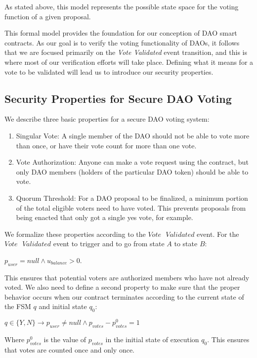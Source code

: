 \documentclass[conference]{IEEEtran}
\begin{document}
As stated above, this model represents the possible state space for the voting function of a given proposal. 

This formal model provides the foundation for our conception of DAO smart contracts. As our goal is to verify the voting functionality of DAOs, it follows that we are focused primarily on the \textit{Vote Validated} event transition, and this is where most of our verification efforts will take place. Defining what it means for a vote to be validated will lead us to introduce our security properties.

\subsection{Security Properties for Secure DAO Voting}
We describe three basic properties for a secure DAO voting system:
\begin{enumerate}
    \item Singular Vote: A single member of the DAO should not be able to vote more than once, or have their vote count for more than one vote.
    \item Vote Authorization: Anyone can make a vote request using the contract, but only DAO members (holders of the particular DAO token) should be able to vote.
    \item Quorum Threshold: For a DAO proposal to be finalized, a minimum portion of the total eligible voters need to have voted. This prevents proposals from being enacted that only got a single yes vote, for example.
\end{enumerate}

We formalize these properties according to the $Vote\mbox{ }Validated$ event.
For the $Vote\mbox{ }Validated$ event to trigger and to go from state $A$ to state $B$:
\begin{center}
$p_{user} = null \land u_{balance} > 0$. 
\end{center}
This ensures that potential voters are authorized members who have not already voted. We also need to define a second property to make sure that the proper behavior occurs when our contract terminates according to the current state of the FSM $q$ and initial state $q_{0}$:
\begin{center}
    $q \in\{Y,N\}\xrightarrow{}p_{user} \neq null \land p_{votes} - p_{votes}^0 = 1$
\end{center}

Where $p_{votes}^0$ is the value of $p_{votes}$ in the initial state of execution $q_0$. This ensures that votes are counted once and only once. 
\end{document}

